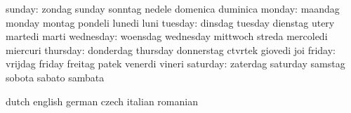                    sunday: zondag                    sunday
                           sonntag                   nedele
                           domenica                  duminica
                   monday: maandag                   monday
                           montag                    pondeli
                           lunedi                    luni
                  tuesday: dinsdag                   tuesday
                           dienstag                  utery
                           martedi                   marti
                wednesday: woensdag                  wednesday
                           mittwoch                  streda
                           mercoledi                 miercuri
                 thursday: donderdag                 thursday
                           donnerstag                ctvrtek
                           giovedi                   joi
                   friday: vrijdag                   friday
                           freitag                   patek
                           venerdi                   vineri
                 saturday: zaterdag                  saturday
                           samstag                   sobota
                           sabato                    sambata
\stopvariables

\startvariables            dutch                     english
                           german                    czech
                           italian                   romanian

